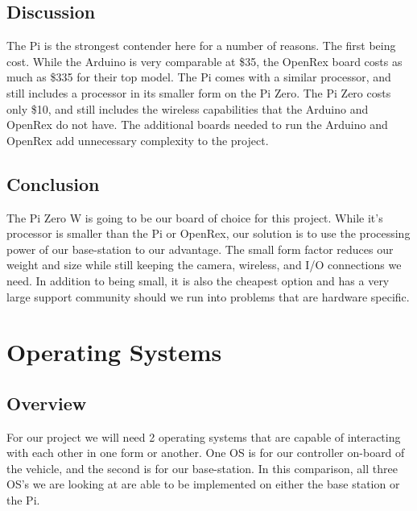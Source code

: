 \documentclass[onecolumn, draftclsnofoot,10pt, compsoc]{IEEEtran}
\begin{document}

\subsection{Discussion}

The Pi is the strongest contender here for a number of reasons. The 
first being cost. While the Arduino is very comparable at \$35, the 
OpenRex board costs as much as \$335 for their top model. The Pi 
comes with a similar processor, and still includes a processor in 
its smaller form on the Pi Zero. The Pi Zero costs only \$10, and 
still includes the wireless capabilities that the Arduino and 
OpenRex do not have. The additional boards needed to run the 
Arduino and OpenRex add unnecessary complexity to the project. 

\subsection{Conclusion}

The Pi Zero W is going to be our board of choice for this project. 
While it's processor is smaller than the Pi or OpenRex, our 
solution is to use the processing power of our base-station to our 
advantage. The small form factor reduces our weight and size while 
still keeping the camera, wireless, and I/O connections we need. In 
addition to being small, it is also the cheapest option and has a 
very large support community should we run into problems that are 
hardware specific. 





\section{Operating Systems}

\subsection{Overview}

For our project we will need 2 operating systems that are capable 
of interacting with each other in one form or another. One OS is for 
our controller on-board of the vehicle, and the second is for our 
base-station. In this comparison, all three OS's we are looking at 
are able to be implemented on either the base station or the Pi.  
\end{document}
